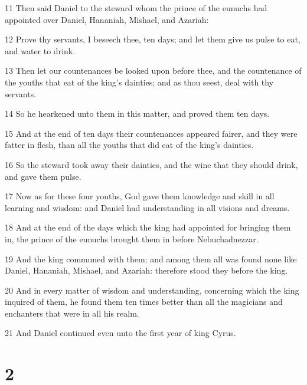 \par 11 Then said Daniel to the steward whom the prince of the eunuchs had appointed over Daniel, Hananiah, Mishael, and Azariah:
\par 12 Prove thy servants, I beseech thee, ten days; and let them give us pulse to eat, and water to drink.
\par 13 Then let our countenances be looked upon before thee, and the countenance of the youths that eat of the king's dainties; and as thou seest, deal with thy servants.
\par 14 So he hearkened unto them in this matter, and proved them ten days.
\par 15 And at the end of ten days their countenances appeared fairer, and they were fatter in flesh, than all the youths that did eat of the king's dainties.
\par 16 So the steward took away their dainties, and the wine that they should drink, and gave them pulse.
\par 17 Now as for these four youths, God gave them knowledge and skill in all learning and wisdom: and Daniel had understanding in all visions and dreams.
\par 18 And at the end of the days which the king had appointed for bringing them in, the prince of the eunuchs brought them in before Nebuchadnezzar.
\par 19 And the king communed with them; and among them all was found none like Daniel, Hananiah, Mishael, and Azariah: therefore stood they before the king.
\par 20 And in every matter of wisdom and understanding, concerning which the king inquired of them, he found them ten times better than all the magicians and enchanters that were in all his realm.
\par 21 And Daniel continued even unto the first year of king Cyrus.

\chapter{2}

